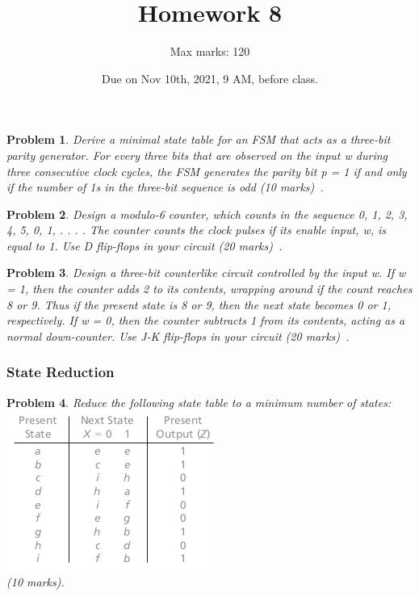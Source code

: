 \documentclass[twocolumn]{article}
\title{Homework 8}
\author{Max marks: 120}
\date{Due on Nov 10th, 2021, 9 AM, before class.}
\newtheorem{prob}{Problem}
\begin{document}
\maketitle
\begin{prob}
  Derive a minimal state table for an FSM that acts as a three-bit parity
generator. For every three bits that are observed on the input w during three
consecutive clock cycles, the FSM generates the parity bit p = 1 if and only if
the number of 1s in the three-bit sequence is odd (10 marks)~\cite[Prob 6.12]{brown2013fundamentals}.
\end{prob}

\begin{prob}
  Design a modulo-6 counter, which counts in the sequence 0, 1, 2, 3, 4, 5, 0,
1, . . . . The counter counts the clock pulses if its enable input, w, is equal
to 1. Use D flip-flops in your circuit (20 marks)~\cite[Prob 6.23]{brown2013fundamentals}.
\end{prob}


\begin{prob}
  Design a three-bit counterlike circuit controlled by the input w. If w = 1,
then the counter adds 2 to its contents, wrapping around if the count reaches 8
or 9. Thus if the present state is 8 or 9, then the next state becomes 0 or 1,
respectively. If w = 0, then the counter subtracts 1 from its contents, acting
as a normal down-counter. Use J-K flip-flops in your circuit (20
marks)~\cite[Prob 6.26]{brown2013fundamentals}.
\end{prob}

\subsubsection*{State Reduction}
\begin{prob}
  Reduce the following state table to a minimum number of states:\\
  \includegraphics[width=\linewidth]{fig-15.2.png}\\
  (10 marks).
\end{prob}
\end{document}
